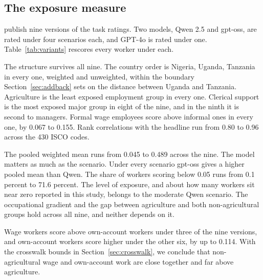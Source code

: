 \subsection{The exposure measure}
\label{sec:measure}

\citet{althoff2026} publish nine versions of the task ratings. Two models,
Qwen 2.5 and gpt-oss, are rated under four scenarios each, and GPT-4o is
rated under one. Table~\ref{tab:variants} rescores every worker under each.

The structure survives all nine. The country order is Nigeria, Uganda, Tanzania
in every one, weighted and unweighted, within the boundary
Section~\ref{sec:addback} sets on the distance between Uganda and Tanzania.
Agriculture is the least exposed
employment group in every one. Clerical support is the most exposed major group
in eight of the nine, and in the ninth it is second to managers. Formal wage
employees score above informal ones in every one, by 0.067 to 0.155. Rank
correlations with the headline run from 0.80 to 0.96 across the 430 ISCO codes.

The pooled
weighted mean runs from 0.045 to 0.489 across the nine. The model matters as
much as the scenario. Under every scenario gpt-oss gives a higher pooled mean
than Qwen. The share of workers scoring below 0.05 runs from 0.1 percent to 71.6
percent. The level of exposure, and about
how many workers sit near zero reported in this study, belongs to the 
moderate Qwen scenario. The occupational gradient and the gap between
agriculture and both non-agricultural groups hold across all nine, and neither
depends on it.

Wage workers score above own-account workers under three of the nine
versions, and own-account workers score higher under the other six, by up to
0.114.  With the crosswalk bounds in Section~\ref{sec:crosswalk}, we
conclude that non-agricultural wage and own-account work are close together
and far above agriculture.

